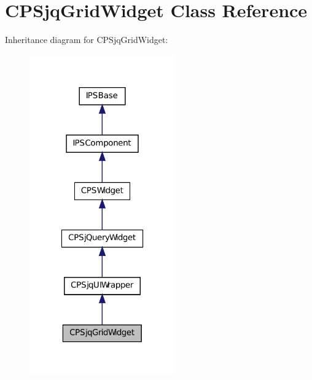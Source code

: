 \hypertarget{classCPSjqGridWidget}{
\section{CPSjqGridWidget Class Reference}
\label{classCPSjqGridWidget}
}


Inheritance diagram for CPSjqGridWidget:\nopagebreak
\begin{figure}[H]
\begin{center}
\leavevmode
\includegraphics[width=178pt]{classCPSjqGridWidget__inherit__graph}
\end{center}
\end{figure}


